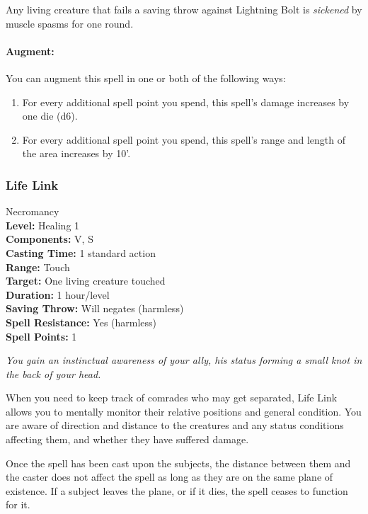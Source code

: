 Any living creature that fails a saving throw against Lightning Bolt is \emph{sickened} by muscle spasms for one round.

\paragraph{Augment:} You can augment this spell in one or both of the following ways:
\begin{enumerate}
 \item For every additional spell point you spend, this spell's damage increases by one die (d6).
 \item For every additional spell point you spend, this spell's range and length of the area increases by 10'.
\end{enumerate}

\subsubsection{Life Link}
\label{Spell:LifeLink}
Necromancy
\\ \textbf{Level:} Healing 1
\\ \textbf{Components:} V, S
\\ \textbf{Casting Time:} 1 standard action
\\ \textbf{Range:} Touch
\\ \textbf{Target:} One living creature touched
\\ \textbf{Duration:} 1 hour/level
\\ \textbf{Saving Throw:} Will negates (harmless)
\\ \textbf{Spell Resistance:} Yes (harmless)
\\ \textbf{Spell Points:} 1

\emph{You gain an instinctual awareness of your ally, his status forming a small knot in the back of your head.}

When you need to keep track of comrades who may get separated, Life Link allows you to mentally monitor their relative positions and general condition. 
You are aware of direction and distance to the creatures and any status conditions affecting them, and whether they have suffered damage.

Once the spell has been cast upon the subjects, the distance between them and the caster does not affect the spell as long as they are on the same plane of existence. 
If a subject leaves the plane, or if it dies, the spell ceases to function for it.

